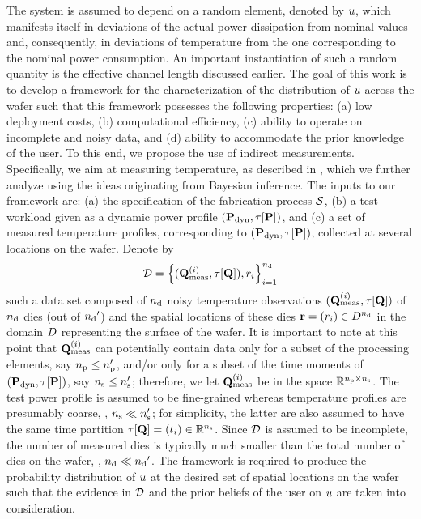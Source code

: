 The system is assumed to depend on a random element, denoted by $u$, which manifests itself in deviations of the actual power dissipation from nominal values and, consequently, in deviations of temperature from the one corresponding to the nominal power consumption. An important instantiation of such a random quantity is the effective channel length discussed earlier. The goal of this work is to develop a framework for the characterization of the distribution of $u$ across the wafer such that this framework possesses the following properties: (a) low deployment costs, (b) computational efficiency, (c) ability to operate on incomplete and noisy data, and (d) ability to accommodate the prior knowledge of the user.
To this end, we propose the use of indirect measurements. Specifically, we aim at measuring temperature, as described in , which we further analyze using the ideas originating from Bayesian inference.
The inputs to our framework are: (a) the specification of the fabrication process $\mathcal{S}$, (b) a test workload given as a dynamic power profile $(\mathbf{P}_{\text{dyn}}, \tau[\mathbf{P}])$, and (c) a set of measured temperature profiles, corresponding to $(\mathbf{P}_{\text{dyn}}, \tau[\mathbf{P}])$, collected at several locations on the wafer. Denote by
\[
  \mathcal{D} = \left\{ (\mathbf{Q}^{(i)}_{\text{meas}}, \tau[\mathbf{Q}]), r_i \right\}_{i = 1}^{n_\text{d}}
\]
such a data set composed of ${n_\text{d}}$ noisy temperature observations $(\mathbf{Q}^{(i)}_{\text{meas}}, \tau[\mathbf{Q}])$ of ${n_\text{d}}$ dies (out of ${n_\text{d}}'$) and the spatial locations of these dies $\mathbf{r} = (r_i) \in D^{n_\text{d}}$ in the domain $D$ representing the surface of the wafer. It is important to note at this point that $\mathbf{Q}^{(i)}_{\text{meas}}$ can potentially contain data only for a subset of the processing elements, say ${n_\text{p}} \leq {n_\text{p}'}$, and/or only for a subset of the time moments of $(\mathbf{P}_{\text{dyn}}, \tau[\mathbf{P}])$, say ${n_\text{s}} \leq {n_\text{s}'}$; therefore, we let $\mathbf{Q}^{(i)}_{\text{meas}}$ be in the space $\mathbb{R}^{{n_\text{p}} \times {n_\text{s}}}$.
The test power profile is assumed to be fine-grained whereas temperature profiles are presumably coarse, \ie, ${n_\text{s}} \ll {n_\text{s}'}$; for simplicity, the latter are also assumed to have the same time partition $\tau[\mathbf{Q}] = (t_i) \in \mathbb{R}^{n_\text{s}}$.
Since $\mathcal{D}$ is assumed to be incomplete, the number of measured dies is typically much smaller than the total number of dies on the wafer, \ie, ${n_\text{d}} \ll {n_\text{d}}'$. The framework is required to produce the probability distribution of $u$ at the desired set of spatial locations on the wafer such that the evidence in $\mathcal{D}$ and the prior beliefs of the user on $u$ are taken into consideration.
